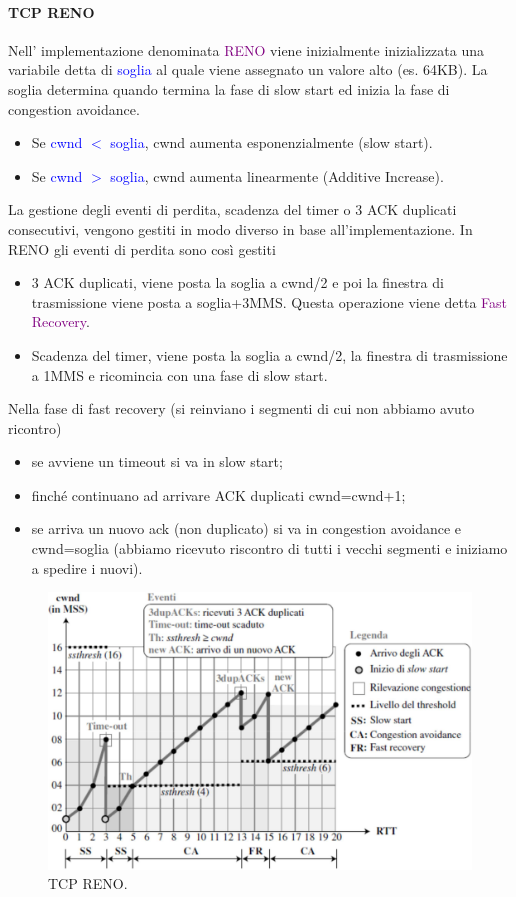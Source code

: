 \paragraph{TCP RENO}
Nell' implementazione denominata \textcolor{purple}{RENO} viene inizialmente inizializzata una variabile detta di \textcolor{blue}{soglia} al quale viene assegnato un valore alto (es. 64KB).
La soglia determina quando termina la fase di slow start ed inizia la fase di congestion avoidance.
\begin{itemize}
    \item Se \textcolor{blue}{cwnd $<$ soglia}, cwnd aumenta esponenzialmente (slow start).
    \item Se \textcolor{blue}{cwnd $>$ soglia}, cwnd aumenta linearmente (Additive Increase).
\end{itemize}
La gestione degli eventi di perdita, scadenza del timer o 3 ACK duplicati consecutivi, vengono gestiti in modo diverso in base all'implementazione.
In RENO gli eventi di perdita sono così gestiti
\begin{itemize}
    \item 3 ACK duplicati, viene posta la soglia a cwnd/2 e poi la finestra di trasmissione viene posta a soglia+3MMS. Questa operazione viene detta \textcolor{purple}{Fast Recovery}.
    \item Scadenza del timer, viene posta la soglia a cwnd/2, la finestra di trasmissione a 1MMS e ricomincia con una fase di slow start.
\end{itemize}
Nella fase di fast recovery (si reinviano i segmenti di cui non abbiamo avuto ricontro)
\begin{itemize}
    \item se avviene un timeout si va in slow start;
    \item finché continuano ad arrivare ACK duplicati cwnd=cwnd+1;
    \item se arriva un nuovo ack (non duplicato) si va in congestion avoidance e cwnd=soglia (abbiamo ricevuto riscontro di tutti i vecchi segmenti e iniziamo a spedire i nuovi).
\end{itemize}

\begin{figure}
    \centering
    \includegraphics[scale=0.28]{Immagini/TCPRENO.png}
    \caption{TCP RENO.}
\end{figure}

